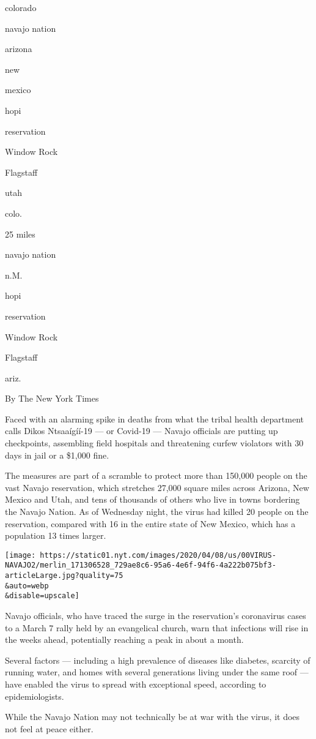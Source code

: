 colorado

navajo nation

arizona

new

mexico

hopi

reservation

Window Rock

Flagstaff

utah

colo.

25 miles

navajo nation

n.M.

hopi

reservation

Window Rock

Flagstaff

ariz.

By The New York Times

Faced with an alarming spike in deaths from what the tribal health
department calls Dikos Ntsaaígíí-19 --- or Covid-19 --- Navajo officials
are putting up checkpoints, assembling field hospitals and threatening
curfew violators with 30 days in jail or a \$1,000 fine.

The measures are part of a scramble to protect more than 150,000 people
on the vast Navajo reservation, which stretches 27,000 square miles
across Arizona, New Mexico and Utah, and tens of thousands of others who
live in towns bordering the Navajo Nation. As of Wednesday night, the
virus had killed 20 people on the reservation, compared with 16 in the
entire state of New Mexico, which has a population 13 times larger.

\texttt{[image: https://static01.nyt.com/images/2020/04/08/us/00VIRUS-NAVAJO2/merlin\_171306528\_729ae8c6-95a6-4e6f-94f6-4a222b075bf3-articleLarge.jpg?quality=75\\\&auto=webp\\\&disable=upscale]}

Navajo officials, who have traced the surge in the reservation's
coronavirus cases to a March 7 rally held by an evangelical church, warn
that infections will rise in the weeks ahead, potentially reaching a
peak in about a month.

Several factors --- including a high prevalence of diseases like
diabetes, scarcity of running water, and homes with several generations
living under the same roof --- have enabled the virus to spread with
exceptional speed, according to epidemiologists.

While the Navajo Nation may not technically be at war with the virus, it
does not feel at peace either.

